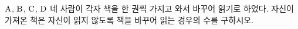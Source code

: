 $\mathrm{A}$, $\mathrm{B}$, $\mathrm{C}$, $\mathrm{D}$ 네 사람이 각자 책을 한 권씩 가지고 와서 바꾸어 읽기로 하였다. 자신이 가져온 책은 자신이 읽지 않도록 책을 바꾸어 읽는 경우의 수를 구하시오.
